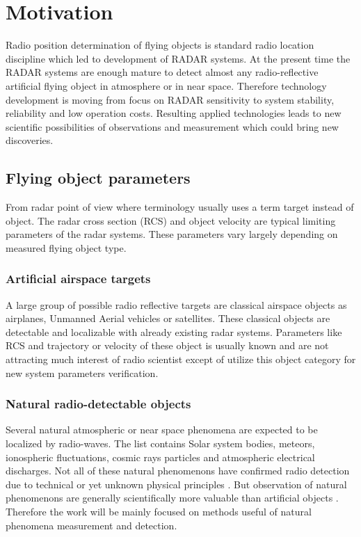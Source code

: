 \documentclass[twoside]{ctuthesis}
\theoremstyle{plain}
\theoremstyle{definition}
\theoremstyle{note}
\begin{document}
\maketitle

\chapter{Motivation}

Radio position determination of flying objects is standard radio location discipline which led to development of RADAR systems. At the present time the RADAR systems are enough mature to detect almost any radio-reflective artificial flying object in atmosphere or in near space. Therefore technology development is moving from focus on RADAR sensitivity to system stability, reliability and low operation costs. Resulting applied technologies leads to new scientific possibilities of observations and measurement which could bring new discoveries. 

\section{Flying object parameters}

From radar point of view where terminology usually uses a term target instead of object. The radar cross section (RCS) and object velocity are typical limiting parameters of the radar systems. These parameters vary largely depending on measured flying object type. 

\subsection{Artificial airspace targets}

A large group of possible radio reflective targets are classical airspace objects as airplanes, Unmanned Aerial vehicles or satellites. These classical objects are detectable and localizable with already existing radar systems. Parameters like RCS and trajectory or velocity of these object is usually known and are not attracting much interest of radio scientist except of utilize this object category for new system parameters verification. 

\subsection{Natural radio-detectable objects}

Several natural atmospheric or near space phenomena are expected to be localized by radio-waves. The list contains Solar system bodies, meteors, ionospheric fluctuations, cosmic rays particles and atmospheric electrical discharges. Not all of these natural phenomenons have confirmed radio detection due to technical or yet unknown physical principles \cite{LOPES}.  But observation of natural phenomenons are generally scientifically more valuable than artificial objects \cite{astro_particles}. Therefore the work will be mainly focused on methods useful of natural phenomena measurement and detection. 
\end{document}
